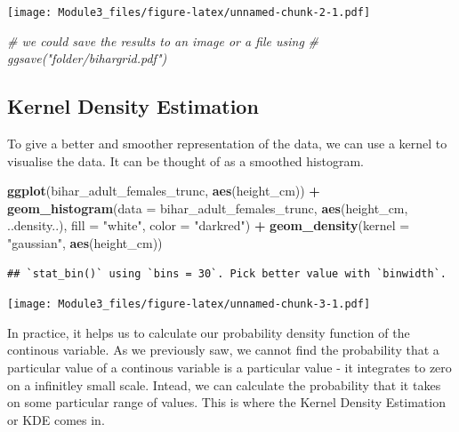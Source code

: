 \documentclass[]{book}
\newenvironment{Shaded}{\begin{snugshade}}{\end{snugshade}}
\newcommand{\KeywordTok}[1]{\textcolor[rgb]{0.13,0.29,0.53}{\textbf{#1}}}
\newcommand{\DataTypeTok}[1]{\textcolor[rgb]{0.13,0.29,0.53}{#1}}
\newcommand{\StringTok}[1]{\textcolor[rgb]{0.31,0.60,0.02}{#1}}
\newcommand{\CommentTok}[1]{\textcolor[rgb]{0.56,0.35,0.01}{\textit{#1}}}
\newcommand{\OperatorTok}[1]{\textcolor[rgb]{0.81,0.36,0.00}{\textbf{#1}}}
\newcommand{\NormalTok}[1]{#1}
\theoremstyle{definition}
\theoremstyle{definition}
\theoremstyle{definition}
\theoremstyle{remark}
\begin{document}
\texttt{[image: Module3\_files/figure-latex/unnamed-chunk-2-1.pdf]}

\begin{Shaded}
\begin{Highlighting}[]
\CommentTok{# we could save the results to an image or a file using }
\CommentTok{# ggsave("folder/bihargrid.pdf")}
\end{Highlighting}
\end{Shaded}

\subsection{Kernel Density Estimation}\label{kernel-density-estimation}

To give a better and smoother representation of the data, we can use a
kernel to visualise the data. It can be thought of as a smoothed
histogram.

\begin{Shaded}
\begin{Highlighting}[]
\KeywordTok{ggplot}\NormalTok{(bihar_adult_females_trunc, }\KeywordTok{aes}\NormalTok{(height_cm)) }\OperatorTok{+}\StringTok{ }
\StringTok{  }\KeywordTok{geom_histogram}\NormalTok{(}\DataTypeTok{data =}\NormalTok{ bihar_adult_females_trunc, }\KeywordTok{aes}\NormalTok{(height_cm, ..density..), }\DataTypeTok{fill =} \StringTok{"white"}\NormalTok{, }\DataTypeTok{color =} \StringTok{"darkred"}\NormalTok{) }\OperatorTok{+}
\StringTok{  }\KeywordTok{geom_density}\NormalTok{(}\DataTypeTok{kernel =} \StringTok{"gaussian"}\NormalTok{, }\KeywordTok{aes}\NormalTok{(height_cm))}
\end{Highlighting}
\end{Shaded}

\begin{verbatim}
## `stat_bin()` using `bins = 30`. Pick better value with `binwidth`.
\end{verbatim}

\texttt{[image: Module3\_files/figure-latex/unnamed-chunk-3-1.pdf]}

In practice, it helps us to calculate our probability density function
of the continous variable. As we previously saw, we cannot find the
probability that a particular value of a continous variable is a
particular value - it integrates to zero on a infinitley small scale.
Intead, we can calculate the probability that it takes on some
particular range of values. This is where the Kernel Density Estimation
or KDE comes in.
\end{document}
